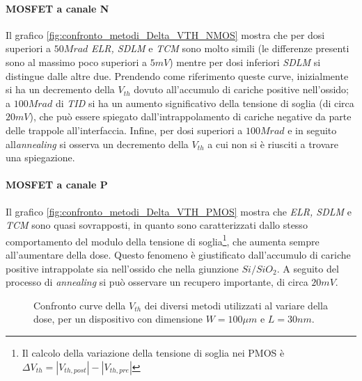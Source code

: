 \paragraph*{MOSFET a canale N} Il grafico \ref{fig:confronto_metodi_Delta_VTH_NMOS} mostra che per dosi superiori a $50 Mrad$ \textit{ELR, SDLM} e \textit{TCM} sono molto simili (le differenze presenti sono al massimo poco superiori a $5mV$) mentre per dosi inferiori \textit{SDLM} si distingue dalle altre due. Prendendo come riferimento queste curve, inizialmente si ha un decremento della $V_{th}$ dovuto all'accumulo di cariche positive nell'ossido; a $100Mrad$ di \emph{TID} si ha un aumento significativo della tensione di soglia (di circa $20mV$), che può essere spiegato dall'intrappolamento di cariche negative da parte delle trappole all'interfaccia. Infine, per dosi superiori a $100Mrad$ e in seguito all\emph{annealing} si osserva un decremento della $V_{th}$ a cui non si è riusciti a trovare una spiegazione. 

\paragraph*{MOSFET a canale P} Il grafico \ref{fig:confronto_metodi_Delta_VTH_PMOS} mostra che \textit{ELR, SDLM} e \textit{TCM} sono quasi sovrapposti, in quanto sono caratterizzati dallo stesso comportamento del modulo della tensione di soglia\footnote{Il calcolo della variazione della tensione di soglia nei PMOS è $\Delta V_{th} = |V_{th,post}| - |V_{th,pre}|$}, che aumenta sempre all'aumentare della dose. Questo fenomeno è giustificato dall'accumulo di cariche positive intrappolate sia nell'ossido che nella giunzione $Si/SiO_2$. A seguito del processo di \emph{annealing} si può osservare un recupero importante, di circa $20mV$.

\begin{figure}[ht]

  \centering
  \label{fig:confronto_metodi_VTH_NMOS}
  \label{fig:confronto_metodi_VTH_PMOS}
  
  \caption[Confronto curve della $V_{th}$ dei diversi metodi utilizzati al variare della dose]{Confronto curve della $V_{th}$ dei diversi metodi utilizzati al variare della dose, per un dispositivo con dimensione $ W=100\mu m$ e $L = 30nm$.}
  \label{fig:confronto_metodi_VTH}
  
\end{figure}

